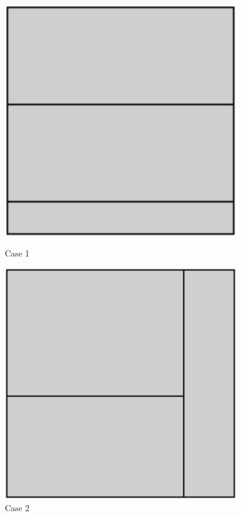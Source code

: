 \begin{figure}[h!]
  \centering
  \begin{minipage}{0.45\textwidth}
    \centering
    \includegraphics[width=0.9\textwidth]{Images/squaredeal-case1.png}
    \caption{Case 1}
    \label{squaredeal:case-1}
  \end{minipage}\hfill
  \begin{minipage}{0.45\textwidth}
    \centering
    \includegraphics[width=0.9\textwidth]{Images/squaredeal-case2.png}
    \caption{Case 2}
    \label{squaredeal:case-2}
  \end{minipage}
\end{figure}

